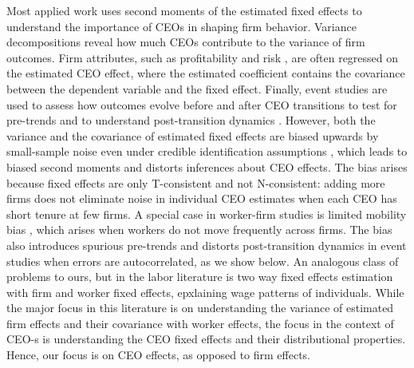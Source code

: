\documentclass[11pt,a4paper]{article}
\begin{document}
Most applied work uses second moments of the estimated fixed effects to understand the importance of CEOs in shaping firm behavior. Variance decompositions reveal how much CEOs contribute to the variance of firm outcomes. Firm attributes, such as profitability \citep{mackey2008effect} and risk \citep{schoar2024effect}, are often regressed on the estimated CEO effect, where the estimated coefficient contains the covariance between the dependent variable and the fixed effect. Finally, event studies are used to assess how outcomes evolve before and after CEO transitions to test for pre-trends and to understand post-transition dynamics \citep{schoar2024effect}. However, both the variance and the covariance of estimated fixed effects are biased upwards by small-sample noise even under credible identification assumptions
\citep{andrews2008high,gaure2014correlation,Bonhomme2023-dx}, which leads to biased second moments and distorts inferences about CEO effects. The bias arises because fixed effects are only T-consistent and not N-consistent: adding more firms does not eliminate noise in individual CEO estimates when each CEO has short tenure at few firms. A special case in worker-firm studies is limited mobility bias \citep{andrews2008high}, which arises when workers do not move frequently across firms. The bias also introduces spurious pre-trends and distorts post-transition dynamics in event studies when errors are autocorrelated, as we show below.
An analogous class of problems to ours, but in the labor literature is two way fixed effects estimation with firm and worker fixed effects, epxlaining wage patterns of individuals. While the major focus in this literature is on understanding the variance of estimated firm effects and their covariance with worker effects, the focus in the context of CEO-s is understanding the CEO fixed effects and their distributional properties. Hence, our focus is on CEO effects, as opposed to firm effects.
\end{document}
